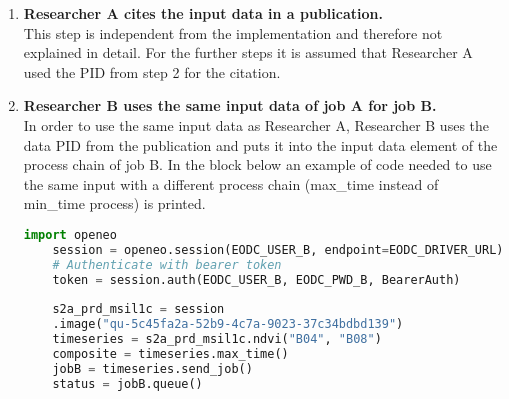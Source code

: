 \documentclass[draft,final]{vutinfth} %
\begin{document}
\begin{enumerate}
	\begin{figure}[h]
		\centering
		\texttt{[image: usecase1\_pid]}
		\caption{Response of the PID created by job A landing page.}
		\label{fig:usecase1-pid} %
	\end{figure}	
	The job\_details variable is an unfiltered python dictionary object that contains the response of the EODC back end. It has a data element at the key of "input\_data" that consists of the input data PID as a resolvable web address. Figure \ref{fig:usecase1-pid} shows the response data of the query PID information. After calling the page, the user is provided by the information of the data. In addition the resulting files of the query and the query (filter arguments) are added to the website. \\
	To gather the information about the input data directly in the python client code, the last three calls of the code block above can be used.  
	
	\item \textbf{Researcher A cites the input data in a publication.} \\
	This step is independent from the implementation and therefore not explained in detail. For the further steps it is assumed that Researcher A used the PID from step 2 for the citation.   
	
	\item \textbf{Researcher B uses the same input data of job A for job B.} \\
	In order to use the same input data as Researcher A, Researcher B uses the data PID from the publication and puts it into the input data element of the process chain of job B. In the block below an example of code needed to use the same input with a different process chain (max\_time instead of min\_time process) is printed.   
	\begin{lstlisting}[frame=single, language=Python]
	import openeo
	session = openeo.session(EODC_USER_B, endpoint=EODC_DRIVER_URL)
	# Authenticate with bearer token
	token = session.auth(EODC_USER_B, EODC_PWD_B, BearerAuth)
	
	s2a_prd_msil1c = session
	.image("qu-5c45fa2a-52b9-4c7a-9023-37c34bdbd139")
	timeseries = s2a_prd_msil1c.ndvi("B04", "B08")
	composite = timeseries.max_time()
	jobB = timeseries.send_job()
	status = jobB.queue()
	\end{lstlisting}
	
\end{enumerate}
\end{document}

